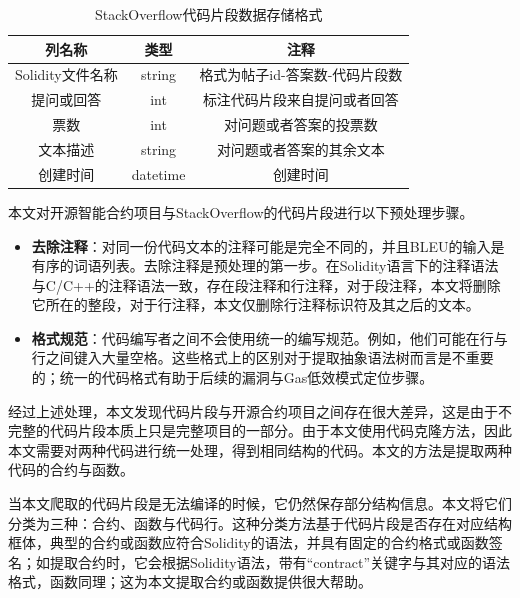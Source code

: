 \begin{table}[htbp]
\centering
\begin{tabular}{|c|c|c|}
\hline
列名称                         & 类型                 & 注释       \\ \hline
Solidity文件名称               & string               & 格式为帖子id-答案数-代码片段数       \\ \hline
提问或回答                     & int                  & 标注代码片段来自提问或者回答   \\ \hline
票数                           & int                  & 对问题或者答案的投票数 \\ \hline
文本描述                       & string               & 对问题或者答案的其余文本 \\ \hline
创建时间                       & datetime             & 创建时间    \\ \hline
\end{tabular}
\caption{StackOverflow代码片段数据存储格式}
\label{snippetFormat}
\end{table}


本文对开源智能合约项目与StackOverflow的代码片段进行以下预处理步骤。

\begin{itemize}

    \item \textbf{去除注释}：对同一份代码文本的注释可能是完全不同的，并且BLEU的输入是有序的词语列表。去除注释是预处理的第一步。在Solidity语言下的注释语法与C/C++的注释语法一致，存在段注释和行注释，对于段注释，本文将删除它所在的整段，对于行注释，本文仅删除行注释标识符及其之后的文本。
    
    \item \textbf{格式规范}：代码编写者之间不会使用统一的编写规范。例如，他们可能在行与行之间键入大量空格。这些格式上的区别对于提取抽象语法树而言是不重要的；统一的代码格式有助于后续的漏洞与Gas低效模式定位步骤。

\end{itemize}

经过上述处理，本文发现代码片段与开源合约项目之间存在很大差异，这是由于不完整的代码片段本质上只是完整项目的一部分。由于本文使用代码克隆方法，因此本文需要对两种代码进行统一处理，得到相同结构的代码。本文的方法是提取两种代码的合约与函数。

当本文爬取的代码片段是无法编译的时候，它仍然保存部分结构信息。本文将它们分类为三种：合约、函数与代码行。这种分类方法基于代码片段是否存在对应结构框体，典型的合约或函数应符合Solidity的语法，并具有固定的合约格式或函数签名；如提取合约时，它会根据Solidity语法，带有“contract”关键字与其对应的语法格式，函数同理；这为本文提取合约或函数提供很大帮助。

